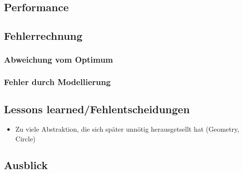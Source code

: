 \documentclass{article}
\begin{document}
\subsection{Performance}

\subsection{Fehlerrechnung}

\subsubsection{Abweichung vom Optimum}

\subsubsection{Fehler durch Modellierung}

\subsection{Lessons learned/Fehlentscheidungen}

\begin{itemize}
\item Zu viele Abstraktion, die sich später unnötig herausgetsellt hat (Geometry, Circle)
\end{itemize}

\subsection{Ausblick}
\end{document}
